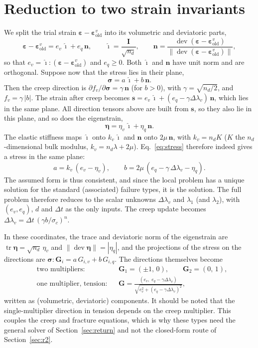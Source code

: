 \documentclass[11pt,a4paper]{article}
\newcommand{\bsig}{\bm{\sigma}}
\newcommand{\beps}{\bm{\varepsilon}}
\newcommand{\bfeta}{\bm{\eta}}
\newcommand{\bG}{\bm{G}}
\newcommand{\ihat}{\hat{\bm{\imath}}}
\newcommand{\bn}{\bm{n}}
\newcommand{\tr}{\operatorname{tr}}
\newcommand{\dev}{\operatorname{dev}}
\begin{document}
\section{Reduction to two strain invariants}

We split the trial strain $\beps-\beps^v_\mathrm{old}$ into its volumetric and deviatoric parts,
\begin{equation}
  \beps-\beps^v_\mathrm{old}=e_v\,\ihat+e_q\,\bn,\qquad
  \ihat=\frac{\bm{I}}{\sqrt{n_d}},\qquad
  \bn=\frac{\dev(\beps-\beps^v_\mathrm{old})}{\|\dev(\beps-\beps^v_\mathrm{old})\|},
\end{equation}
so that $e_v=\ihat:(\beps-\beps^v_\mathrm{old})$ and $e_q\geq0$. Both $\ihat$ and $\bn$ have unit
norm and are orthogonal. Suppose now that the stress lies in their plane,
\begin{equation}
  \bsig=a\,\ihat+b\,\bn .
\end{equation}
Then the creep direction is $\partial f_v/\partial\bsig=\gamma\,\bn$ (for $b>0$), with
$\gamma=\sqrt{n_d/2}$, and $f_v=\gamma\,|b|$. The strain after creep becomes
$\bm{s}=e_v\,\ihat+(e_q-\gamma\Delta\lambda_v)\,\bn$, which lies in the same plane. All direction
tensors above are built from $\bm{s}$, so they also lie in this plane, and so does the
eigenstrain,
\begin{equation}
  \bfeta=\eta_v\,\ihat+\eta_q\,\bn .
\end{equation}
The elastic stiffness maps $\ihat$ onto $k_v\,\ihat$ and $\bn$ onto $2\mu\,\bn$, with
$k_v=n_dK$ ($K$ the $n_d$-dimensional bulk modulus, $k_v=n_d\lambda+2\mu$). Eq.~\eqref{eq:stress}
therefore indeed gives a stress in the same plane:
\begin{equation}
  a=k_v\,(e_v-\eta_v),\qquad b=2\mu\,(e_q-\gamma\,\Delta\lambda_v-\eta_q).
  \label{eq:ab}
\end{equation}
The assumed form is thus consistent, and since the local problem has a unique solution for the
standard (associated) failure types, it is the solution. The full problem therefore reduces to
the scalar unknowns $\Delta\lambda_v$ and $\lambda_1$ (and $\lambda_2$), with $(e_v,e_q)$, $d$
and $\Delta t$ as the only inputs. The creep update becomes
$\Delta\lambda_v=\Delta t\,(\gamma b/\sigma_c)^n$.

In these coordinates, the trace and deviatoric norm of the eigenstrain are
$\tr\bfeta=\sqrt{n_d}\,\eta_v$ and $\|\dev\bfeta\|=|\eta_q|$, and the projections of the stress
on the directions are $\bsig:\bG_i=a\,G_{i,v}+b\,G_{i,q}$. The directions themselves become
\begin{align}
  &\text{two multipliers:} && \bG_1=(\pm1,\,0),\qquad \bG_2=(0,\,1),\\
  &\text{one multiplier, tension:} && \bG=\frac{(e_v,\;e_q-\gamma\Delta\lambda_v)}{\sqrt{e_v^2+(e_q-\gamma\Delta\lambda_v)^2}},
\end{align}
written as (volumetric, deviatoric) components.
It should be noted that the single-multiplier direction in tension depends on the creep
multiplier. This couples the creep and fracture equations, which is why these types need the
general solver of Section~\ref{sec:return} and not the closed-form route of
Section~\ref{sec:r2}.
\end{document}
